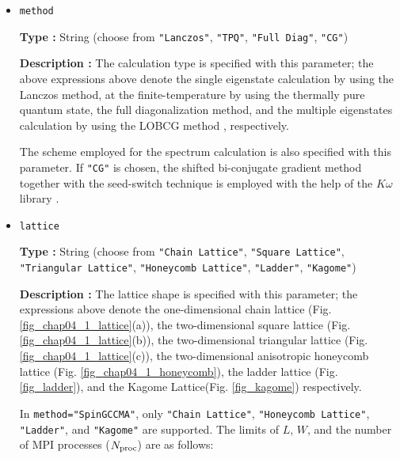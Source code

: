 \begin{itemize}
When \verb|model="SpinGCCMA"|,
by using a more efficient algorithm\footnote{Y. Yamaji \textit{et. al.}, manuscript in preparation.}, 
$\HPhi$ calculates a system that is the same as \verb|"SpinGC"|.
However, supported models and MPI processes are highly limited.
See \verb|"Lattice"| section.

\item \verb|method|
  
{\bf Type :} String (choose from \verb|"Lanczos"|, \verb|"TPQ"|, \verb|"Full Diag"|, \verb|"CG"|)

{\bf Description :} The calculation type is specified with this parameter;
the above expressions above denote 
the single eigenstate calculation by using the Lanczos method,
at the finite-temperature by using the thermally pure quantum state,
the full diagonalization method,
and the multiple eigenstates calculation by using the LOBCG method
\cite{doi:10.1137/S1064827500366124,transactionJSCES2006},
respectively.

The scheme employed for the spectrum calculation is also specified with this parameter.
If \verb|"CG"| is chosen, the shifted bi-conjugate gradient method \cite{Frommer2003}
together with the seed-switch technique \cite{doi:10.1143/JPSJ.77.114713} is employed
with the help of the $K\omega$ library \cite{komega}.

\item \verb|lattice|

{\bf Type :} String (choose from \verb|"Chain Lattice"|, \verb|"Square Lattice"|, 
\verb|"Triangular Lattice"|, \verb|"Honeycomb Lattice"|, \verb|"Ladder"|, \verb|"Kagome"|)

{\bf Description :} The lattice shape is specified with this parameter;
the expressions above denote
the one-dimensional chain lattice (Fig. \ref{fig_chap04_1_lattice}(a)), 
the two-dimensional square lattice (Fig. \ref{fig_chap04_1_lattice}(b)),
the two-dimensional triangular lattice (Fig. \ref{fig_chap04_1_lattice}(c)),
the two-dimensional anisotropic honeycomb lattice (Fig. \ref{fig_chap04_1_honeycomb}),
the ladder lattice (Fig. \ref{fig_ladder}),
and
the Kagome Lattice(Fig. \ref{fig_kagome})
respectively.

In \verb|method="SpinGCCMA"|,
only \verb|"Chain Lattice"|, \verb|"Honeycomb Lattice"|, 
\verb|"Ladder"|, and \verb|"Kagome"| are supported.
The limits of $L$, $W$, and the number of MPI processes ($N_{\rm proc}$) are as follows:

\begin{itemize}


\end{itemize}
\end{itemize}
